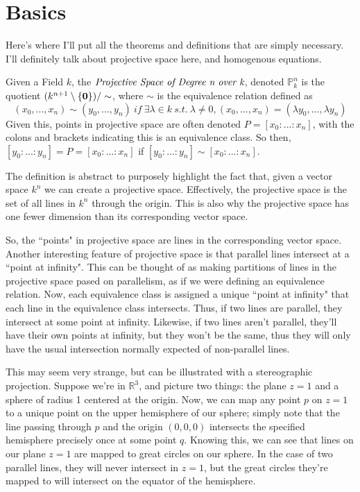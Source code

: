 \section{Basics}
Here's where I'll put all the theorems and definitions that
are simply necessary. I'll definitely talk about projective
space here, and homogenous equations.

\begin{mydef}
Given a Field $k$, the $\emph{Projective Space of Degree n over k}$, denoted $\mathbb{P}^n_k$
is the quotient $(k^{n+1} \setminus \{\bold{0}\}) / \sim$, where $\sim$ is the equivalence relation 
defined as 
\[
(x_0, ..., x_n) \sim (y_0, ..., y_n)~if~\exists \lambda \in k~s.t.~\lambda \neq 0,
(x_0, ..., x_n) = (\lambda y_0, ..., \lambda y_n)
\]
Given this, points in projective space are often denoted $P = [ x_0 : ... : x_n]$,
with the colons and brackets indicating this is an equivalence class. So then,
$[ y_0: ... : y_n ] = P = [ x_0 : ... : x_n ]$ if $[ y_0: ... : y_n ] \sim [ x_0 : ... : x_n ]$.
\end{mydef}
The definition is abstract to purposely highlight the fact that, 
given a vector space $k^{n}$ we can create a projective space.
Effectively, the projective space is the set of all lines in 
$k^n$ through the origin. This is also why the projective space
has one fewer dimension than its corresponding vector space.

So, the ``points" in projective space are lines in the corresponding
vector space. Another interesting feature of projective space is
that parallel lines intersect at a ``point at infinity". This can
be thought of as making partitions of lines in the projective space
pased on parallelism, as if we were defining an equivalence relation.
Now, each equivalence class is assigned a unique ``point at infinity"
that each line in the equivalence class intersects. Thus, if two lines
are parallel, they intersect at some point at infinity. Likewise, if
two lines aren't parallel, they'll have their own points at infinity,
but they won't be the same, thus they will only have the usual intersection
normally expected of non-parallel lines.

This may seem very strange, but can be illustrated with a stereographic
projection. Suppose we're in $\mathbb{R}^3$, and picture two things:
the plane $z=1$ and a sphere of radius 1 centered at the origin.
Now, we can map any point $p$ on $z=1$ to a unique point on the upper
hemisphere of our sphere; simply note that the line passing through
$p$ and the origin $(0, 0, 0)$ intersects the specified hemisphere
precisely once at some point $q$. Knowing this, we can see that lines
on our plane $z=1$ are mapped to great circles on our sphere. In the
case of two parallel lines, they will never intersect in $z=1$, but
the great circles they're mapped to will intersect on the equator of 
the hemisphere.

